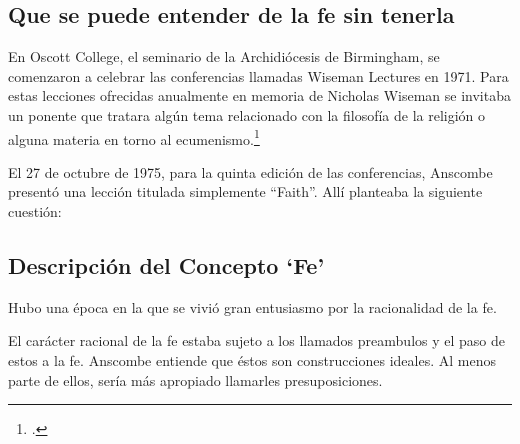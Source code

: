 \subsection{Que se puede entender de la fe sin tenerla}
En Oscott College, el seminario de la Archidiócesis de Birmingham, se comenzaron
a celebrar las conferencias llamadas Wiseman Lectures en 1971. Para estas
lecciones ofrecidas anualmente en memoria de Nicholas Wiseman se invitaba un
ponente que tratara algún tema relacionado con la filosofía de la religión o
alguna materia en torno al ecumenismo.\footcite[cf.~][p.~7]{wisemanlects}

El 27 de octubre de 1975, para la quinta edición de las conferencias, Anscombe
presentó una lección titulada simplemente ``Faith''. Allí planteaba la
siguiente cuestión: 

\subsection{Descripción del Concepto `Fe'}
Hubo una época en la que se vivió gran entusiasmo por la racionalidad de la
fe.

El carácter racional de la fe estaba sujeto a los llamados preambulos y el
paso de estos a la fe. Anscombe entiende que éstos son construcciones ideales.
Al menos parte de ellos, sería más apropiado llamarles
presuposiciones.
